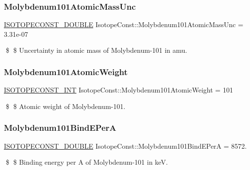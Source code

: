 \subsubsection{\texorpdfstring{Molybdenum101\+Atomic\+Mass\+Unc}{Molybdenum101AtomicMassUnc}}
{\footnotesize\ttfamily \mbox{\hyperlink{group___isotope_const-_macros_ga8f45a7272ce02c0b4c65c44636ed719a}{I\+S\+O\+T\+O\+P\+E\+C\+O\+N\+S\+T\+\_\+\+D\+O\+U\+B\+LE}} Isotope\+Const\+::\+Molybdenum101\+Atomic\+Mass\+Unc = 3.\+31e-\/07}

\$ \$ Uncertainty in atomic mass of Molybdenum-\/101 in amu. \mbox{\label{group___isotope_const-_molybdenum-_mo101_ga8c59c7b254f362a473f9b008ff7b05b6}} 
\subsubsection{\texorpdfstring{Molybdenum101\+Atomic\+Weight}{Molybdenum101AtomicWeight}}
{\footnotesize\ttfamily \mbox{\hyperlink{group___isotope_const-_macros_ga5f18360b3e99483a35c32d789e62621c}{I\+S\+O\+T\+O\+P\+E\+C\+O\+N\+S\+T\+\_\+\+I\+NT}} Isotope\+Const\+::\+Molybdenum101\+Atomic\+Weight = 101}

\$ \$ Atomic weight of Molybdenum-\/101. \mbox{\label{group___isotope_const-_molybdenum-_mo101_gab9e6215c45f4b5259be2ffe60035d086}} 
\subsubsection{\texorpdfstring{Molybdenum101\+Bind\+E\+PerA}{Molybdenum101BindEPerA}}
{\footnotesize\ttfamily \mbox{\hyperlink{group___isotope_const-_macros_ga8f45a7272ce02c0b4c65c44636ed719a}{I\+S\+O\+T\+O\+P\+E\+C\+O\+N\+S\+T\+\_\+\+D\+O\+U\+B\+LE}} Isotope\+Const\+::\+Molybdenum101\+Bind\+E\+PerA = 8572.}

\$ \$ Binding energy per A of Molybdenum-\/101 in keV. \mbox{\label{group___isotope_const-_molybdenum-_mo101_gaf89cba136c8de94e86fffea8ccf1373d}} 
